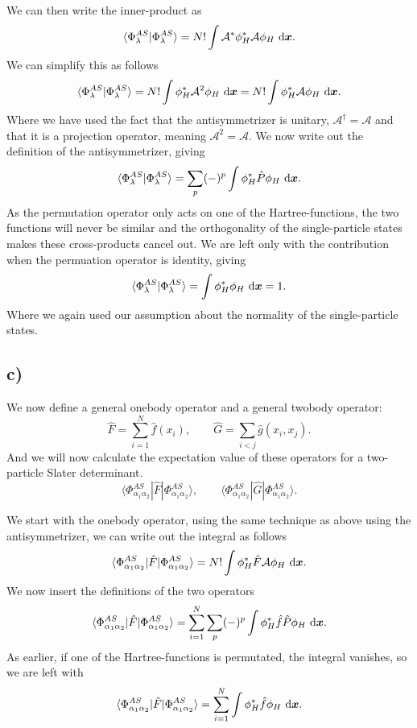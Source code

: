 \documentclass[a4paper, 11pt, notitlepage, english]{article}
\newcommand{\braket}[2]{\langle #1 | #2 \rangle}
\newcommand{\op}[1]{\hat{#1}}
\newcommand{\braopket}[3]{\langle #1 | {#2} | #3 \rangle}
\renewcommand{\d}{{\rm d}}
\newcommand{\bt}[1]{\boldsymbol{#1}}
\begin{document}
We can then write the inner-product as
$$\braket{\Phi_\lambda^{AS}}{\Phi_\lambda^{AS}} = N! \int \mathcal{A}^* \phi^*_H \mathcal{A} \phi_H \ \d \bt{x} .$$
We can simplify this as follows
$$\braket{\Phi_\lambda^{AS}}{\Phi_\lambda^{AS}} = N! \int \phi^*_H \mathcal{A}^2 \phi_H \ \d \bt{x} = N! \int \phi^*_H \mathcal{A} \phi_H \ \d \bt{x}.$$
Where we have used the fact that the antisymmetrizer is unitary, $\mathcal{A}^\dagger = \mathcal{A}$ and that it is a projection operator, meaning $\mathcal{A}^2 = \mathcal{A}$.
We now write out the definition of the antisymmetrizer, giving
$$\braket{\Phi_\lambda^{AS}}{\Phi_\lambda^{AS}} = \sum_p (-)^p \int \phi^*_H \\\op{P} \phi_H \ \d \bt{x}.$$
As the permutation operator only acts on one of the Hartree-functions, the two functions will never be similar and the orthogonality of the single-particle states makes these cross-products cancel out. We are left only with the contribution when the permuation operator is identity, giving
$$\braket{\Phi_\lambda^{AS}}{\Phi_\lambda^{AS}} = \int \phi^*_H \phi_H \ \d \bt{x} = 1.$$
Where we again used our assumption about the normality of the single-particle states.

\subsection*{c)}
We now define a general onebody operator and a general twobody operator:
$$\op{F} = \sum_{i=1}^N \op{f}(x_i), \qquad \op{G} = \sum_{i<j} \op{g}(x_i, x_j).$$
And we will now calculate the expectation value of these operators for a two-particle Slater determinant.
$$\braopket{\Phi^{AS}_{\alpha_1\alpha_2}}{\op{F}}{\Phi^{AS}_{\alpha_1\alpha_2}}, \qquad \braopket{\Phi^{AS}_{\alpha_1\alpha_2}}{\op{G}}{\Phi^{AS}_{\alpha_1\alpha_2}}.$$

We start with the onebody operator, using the same technique as above using the antisymmetrizer, we can write out the integral as follows
$$\braopket{\Phi^{AS}_{\alpha_1\alpha_2}}{\op{F}}{\Phi^{AS}_{\alpha_1\alpha_2}} = N! \int \phi_H^* \op{F} \mathcal{A} \phi_H \ \d \bt{x}.$$
We now insert the definitions of the two operators
$$\braopket{\Phi^{AS}_{\alpha_1\alpha_2}}{\op{F}}{\Phi^{AS}_{\alpha_1\alpha_2}} = \sum_{i=1}^N \sum_p (-)^p \int \phi_H^* \op{f} \op{P} \phi_H \ \d \bt{x}.$$
As earlier, if one of the Hartree-functions is permutated, the integral vanishes, so we are left with
$$\braopket{\Phi^{AS}_{\alpha_1\alpha_2}}{\op{F}}{\Phi^{AS}_{\alpha_1\alpha_2}} = \sum_{i=1}^N \int \phi_H^* \op{f} \phi_H \ \d \bt{x}.$$
\end{document}
